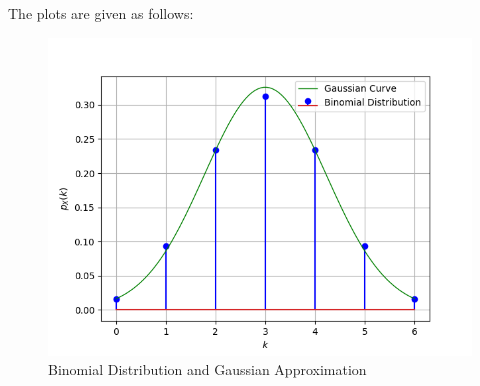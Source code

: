 \documentclass[journal,12pt,twocolumn]{IEEEtran}
\theoremstyle{remark}
\begin{document}
The plots are given as follows:
\begin{figure}[h]
\centering
\includegraphics[width=\columnwidth]{figures/PDF_and_PMF.png}
\caption{Binomial Distribution and Gaussian Approximation}
\label{fig:Triangle}
\end{figure}
\end{document}
